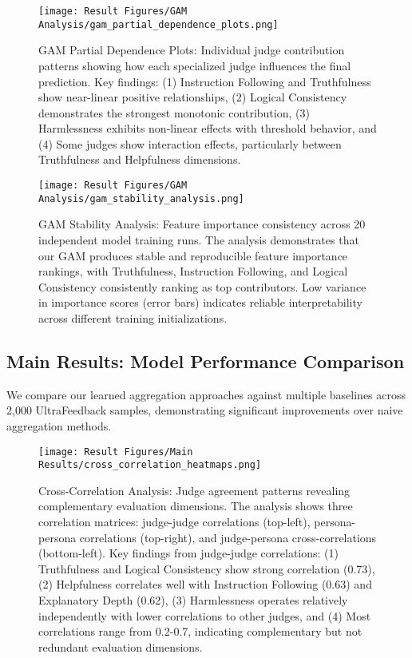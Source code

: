 \begin{figure}[H]
    \centering
    \texttt{[image: Result Figures/GAM Analysis/gam\_partial\_dependence\_plots.png]}
    \caption{GAM Partial Dependence Plots: Individual judge contribution patterns showing how each specialized judge influences the final prediction. Key findings: (1) Instruction Following and Truthfulness show near-linear positive relationships, (2) Logical Consistency demonstrates the strongest monotonic contribution, (3) Harmlessness exhibits non-linear effects with threshold behavior, and (4) Some judges show interaction effects, particularly between Truthfulness and Helpfulness dimensions.}
    \label{fig:gam_partial_dependence}
\end{figure}

\begin{figure}[H]
    \centering
    \texttt{[image: Result Figures/GAM Analysis/gam\_stability\_analysis.png]}
    \caption{GAM Stability Analysis: Feature importance consistency across 20 independent model training runs. The analysis demonstrates that our GAM produces stable and reproducible feature importance rankings, with Truthfulness, Instruction Following, and Logical Consistency consistently ranking as top contributors. Low variance in importance scores (error bars) indicates reliable interpretability across different training initializations.}
    \label{fig:gam_stability}
\end{figure}

\subsection{Main Results: Model Performance Comparison}

We compare our learned aggregation approaches against multiple baselines across 2,000 UltraFeedback samples, demonstrating significant improvements over naive aggregation methods.

\begin{figure}[H]
    \centering
    \texttt{[image: Result Figures/Main Results/cross\_correlation\_heatmaps.png]}
    \caption{Cross-Correlation Analysis: Judge agreement patterns revealing complementary evaluation dimensions. The analysis shows three correlation matrices: judge-judge correlations (top-left), persona-persona correlations (top-right), and judge-persona cross-correlations (bottom-left). Key findings from judge-judge correlations: (1) Truthfulness and Logical Consistency show strong correlation (0.73), (2) Helpfulness correlates well with Instruction Following (0.63) and Explanatory Depth (0.62), (3) Harmlessness operates relatively independently with lower correlations to other judges, and (4) Most correlations range from 0.2-0.7, indicating complementary but not redundant evaluation dimensions.}
    \label{fig:cross_correlation}
\end{figure}

